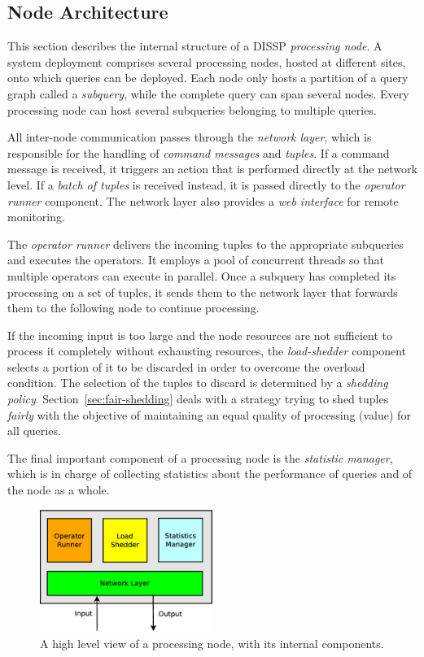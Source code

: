 \subsection{Node Architecture}
\label{sec:node-arch}	
This section describes the internal structure of a DISSP \emph{processing node}.  
A system deployment comprises several processing nodes, hosted at different sites, onto
which queries can be deployed. 
Each node only hosts a partition of a query graph called a \emph{subquery}, while the complete query can
span several nodes. 
Every processing node can host several subqueries belonging to multiple queries.

All inter-node communication passes through the \emph{network layer}, which is responsible for the
handling of \emph{command messages} and \emph{tuples}.
If a command message is received, it triggers an action that is performed directly at the network
level. 
If a \emph{batch of tuples} is received instead, it is passed directly to the \emph{operator runner}
component.
The network layer also provides a \emph{web interface} for remote monitoring.

The \emph{operator runner} delivers the incoming tuples to the appropriate subqueries
and executes the operators.  
It employs a pool of concurrent threads so that multiple operators can execute in
parallel.
Once a subquery has completed its processing on a set of tuples, it sends them to the network layer that
forwards them to the following node to continue processing.

If the incoming input is too large and the node resources are not sufficient to process it completely
without exhausting resources, the \emph{load-shedder} component selects a portion
of it to be discarded in order to overcome the overload condition. 
The selection of the tuples to discard is determined by a \emph{shedding policy}.
Section~\ref{sec:fair-shedding} deals with a strategy trying to shed tuples \emph{fairly} with the
objective of maintaining an equal quality of processing (\ie \sic value) for all queries.

The final important component of a processing node is the \emph{statistic manager}, which is in
charge of collecting statistics about the performance of queries and of the node as a whole. 

\begin{figure}[t!]
	\centering
	\label{fig:node}	
		\includegraphics[width=0.5\textwidth]{img/tesi/node} 
		\caption{A high level view of a processing node, with its internal components.}
\end{figure}

